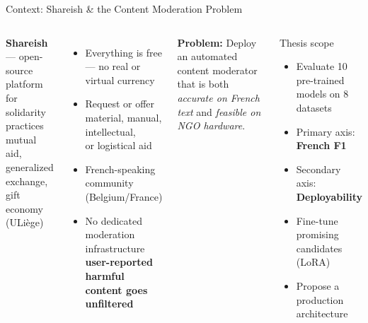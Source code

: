 \documentclass[aspectratio=169, 12pt]{beamer}
\newcommand{\bad}[1]{\textcolor{warnred}{\textbf{#1}}}
\begin{document}
\begin{frame}[shrink=25]{Context: Shareish \& the Content Moderation Problem}
  \begin{columns}[T]
      \textbf{Shareish} — open-source platform for solidarity practices\\
      {\small mutual aid, generalized exchange, gift economy (ULiège)}
      \begin{itemize}
        \item Everything is free — no real or virtual currency
        \item Request or offer material, manual, intellectual,\\
              or logistical aid
        \item French-speaking community (Belgium/France)
        \item No dedicated moderation infrastructure\\
              \bad{user-reported harmful content goes unfiltered}
      \end{itemize}
      \vspace{4pt}
      \textbf{Problem:} Deploy an automated content moderator that is both
      \emph{accurate on French text} and \emph{feasible on NGO hardware}.

      \begin{block}{Thesis scope}
        \begin{itemize}
          \item Evaluate 10 pre-trained models on 8 datasets
          \item Primary axis: \textbf{French F1}
          \item Secondary axis: \textbf{Deployability}
          \item Fine-tune promising candidates (LoRA)
          \item Propose a production architecture
        \end{itemize}
      \end{block}
  \end{columns}
\end{frame}
\end{document}
